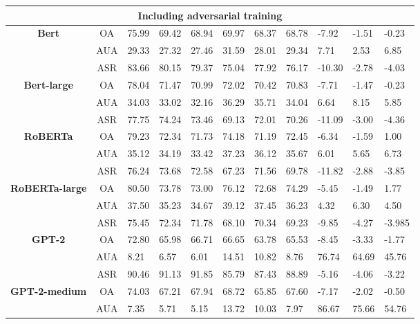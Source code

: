\documentclass{article}
\begin{document}
\begin{table}[ht]
\begin{tabular}{c|c|p{0.6cm}p{0.6cm}p{0.6cm}|p{1cm}p{1cm}p{1cm}|p{1cm}p{1cm}p{1cm}}
\multicolumn{11}{c}{\textbf{Including adversarial training}} \\ \hline
\multirow{3}{*}{\textbf{Bert}} & OA   & 75.99  & 69.42 & 68.94 & 69.97 & 68.37 & 68.78 & -7.92 & -1.51 & -0.23 \\ 
& AUA  & 29.33  & 27.32  & 27.46  & 31.59 & 28.01 & 29.34  & 7.71  & 2.53  & 6.85 \\ 
& ASR  & 83.66 & 80.15 & 79.37 & 75.04 & 77.92 & 76.17 & -10.30 & -2.78 & -4.03 \\ \hline
\multirow{3}{*}{\textbf{Bert-large}} & OA   & 78.04 & 71.47 & 70.99 & 72.02 & 70.42 & 70.83 & -7.71  & -1.47 & -0.23 \\
                                      & AUA  & 34.03 & 33.02 & 32.16 & 36.29 & 35.71 & 34.04 & 6.64   & 8.15  & 5.85  \\
                                      & ASR  & 77.75 & 74.24 & 73.46 & 69.13 & 72.01 & 70.26 & -11.09 & -3.00 & -4.36 \\ \hline
\multirow{3}{*}{\textbf{RoBERTa}} & OA & 79.23 & 72.34 & 71.73 & 74.18 & 71.19 & 72.45 & -6.34 & -1.59 & 1.00 \\ 
& AUA & 35.12 & 34.19 & 33.42 & 37.23 & 36.12 & 35.67 & 6.01 & 5.65 & 6.73 \\ 
& ASR & 76.24 & 73.68 & 72.58 & 67.23 & 71.56 & 69.78 & -11.82 & -2.88 & -3.85 \\ \hline
\multirow{3}{*}{\textbf{RoBERTa-large}} & OA & 80.50 & 73.78 & 73.00 & 76.12 & 72.68 & 74.29 & -5.45 & -1.49 & 1.77 \\ 
& AUA & 37.50 & 35.23 & 34.67 & 39.12 & 37.45 & 36.23 & 4.32 & 6.30 & 4.50 \\ 
& ASR & 75.45 & 72.34 & 71.78 & 68.10 & 70.34 & 69.23 & -9.85 & -4.27 & -3.985 \\ \hline
\multirow{3}{*}{\textbf{GPT-2}}        & OA   & 72.80 & 65.98 & 66.71 & 66.65 & 63.78 & 65.53 & -8.45  & -3.33 & -1.77 \\
                                      & AUA  & 8.21  & 6.57  & 6.01  & 14.51 & 10.82 & 8.76  & 76.74  & 64.69 & 45.76 \\
                                      & ASR  & 90.46 & 91.13 & 91.85 & 85.79 & 87.43 & 88.89 & -5.16  & -4.06 & -3.22 \\ \hline
\multirow{3}{*}{\textbf{GPT-2-medium}}        & OA   & 74.03  & 67.21 & 67.94 & 68.72 & 65.85 & 67.60 & -7.17 & -2.02 & -0.50 \\ 
& AUA  & 7.35   & 5.71  & 5.15  & 13.72 & 10.03 & 7.97  & 86.67 & 75.66 & 54.76 \\ 

\end{tabular}
\end{table}
\end{document}
